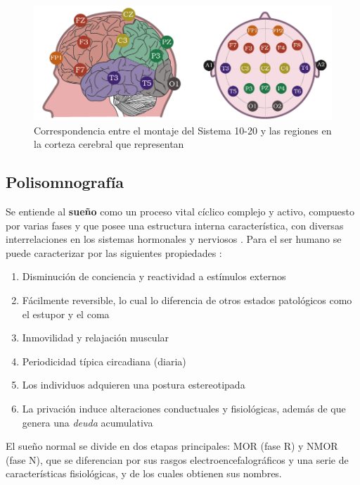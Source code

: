 \begin{figure}
\centering
\includegraphics[width=\linewidth]{./img_diagramas/cerebro_1020_v2.pdf} 
\caption{Correspondencia entre el montaje del Sistema 10-20 y las regiones en la corteza cerebral 
que representan
}
\label{corresponde_1020}
\end{figure}


\subsection{Polisomnografía}

Se entiende al \textbf{sueño} como un proceso vital cíclico complejo y activo, compuesto por 
varias fases y que posee una estructura interna característica, con diversas interrelaciones en los 
sistemas hormonales y nerviosos \cite{FernandezConde07}.
Para el ser humano se puede caracterizar por las siguientes propiedades \cite{CarrilloMora}:
\begin{enumerate}
\item Disminución de conciencia y reactividad a estímulos externos
\item Fácilmente reversible, lo cual lo diferencia de otros estados patológicos como el estupor y 
el coma
\item Inmovilidad y relajación muscular
\item Periodicidad típica circadiana (diaria)
\item Los individuos adquieren una postura estereotipada
\item La privación induce alteraciones conductuales y 
fisiológicas, además de que genera una \textit{deuda} acumulativa
\end{enumerate}

El sueño normal se divide en dos etapas principales: MOR (fase R) y NMOR (fase N), que se 
diferencian por sus rasgos electroencefalográficos y una serie de características fisiológicas, y 
de los cuales obtienen sus nombres.

